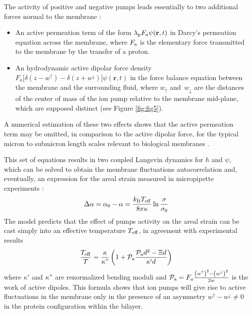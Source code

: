 \documentclass[graybox]{svmult}
\begin{document}
The activity of positive and negative pumps leads essentially to two additional forces normal to the membrane : 
\begin{itemize}
	\item An active permeation term of the form $\lambda_{\rm{p}}F_{\rm{a}}\psi(\mathbf{r},t)$ in Darcy's permeation equation across the membrane, where $F_{\rm{a}}$ is the elementary force transmitted to the membrane by the transfer of a proton.
	 \item An hydrodynamic active dipolar force density $F_a\big[ \delta(z-w^{\uparrow}) - \delta(z+w^{\downarrow})\big]\psi(\mathbf{r},t)$ in the force balance equation between the membrane and the surrounding fluid, where $w_{\uparrow}$ and $\, w_{\downarrow}$ are the distances of the center of mass of the ion pump relative to the membrane mid-plane, which are supposed distinct (see Figure \ref{fig:fig5}). 
\end{itemize} 
A numerical estimation of these two effects shows that the active permeation term may be omitted, in comparison to the active dipolar force, for the typical micron to submicron length scales relevant to biological membranes \cite{Manneville:2001}.

This set of equations results in two coupled Langevin dynamics for $h$ and $\psi$, which can be solved to obtain the membrane fluctuations autocorrelation and, eventually, an expression for the areal strain measured in micropipette experiments \cite{Manneville:2001}:
\begin{equation}
\Delta \alpha = \alpha_0 - \alpha  = \frac{k_{\rm{B}}T_{\rm{eff}}}{8\pi \kappa}\ln \frac{\sigma}{\sigma_0}
\end{equation}
The model predicts that the effect of pumps activity on the areal strain can be cast simply into an effective temperature $T_{\rm{eff}}$, in agreement with experimental results
\begin{equation}
\frac{T_{\rm{eff}}}{T} = \frac{\kappa}{\kappa"}\left( 1 + \mathcal{P}_{\rm{a}}\frac{\mathcal{P}_{\rm{a}}d^2 - \Xi d}{\kappa' d} \right) 
\end{equation}
where $\kappa'$ and $\kappa"$ are renormalized bending moduli and $\mathcal{P}_{\rm{a}} = F_a\frac{\left(w^{\uparrow}\right)^2-\left(w^{\downarrow}\right)^2}{2w}$ is the work of active dipoles. This formula shows that ion pumps will give rise to active fluctuations in the membrane only in the presence of an asymmetry $w^{\uparrow}-w^{\downarrow}\neq 0$ in the protein configuration within the bilayer.
	
\end{document}
